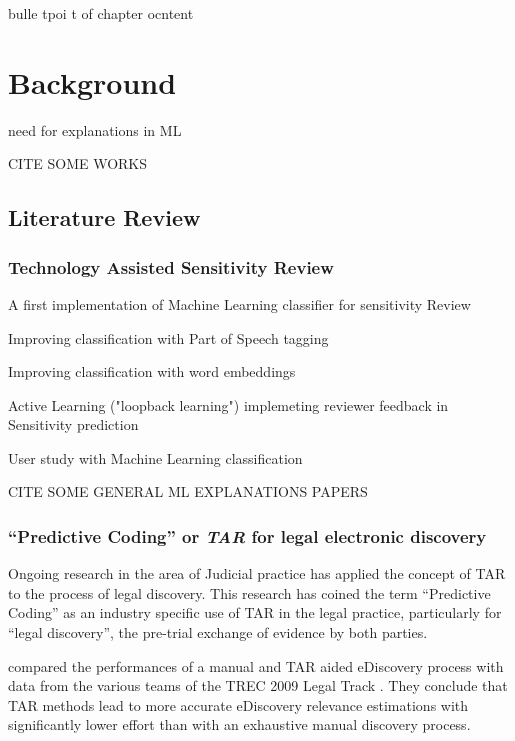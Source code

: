 \documentclass{l4proj}
\begin{document}
bulle tpoi t of chapter ocntent


\chapter{Background}

need for explanations in ML

CITE SOME WORKS

\section{Literature Review}

\subsection{Technology Assisted Sensitivity Review}


\autocite{de_rijke_towards_2014} A first implementation of Machine Learning classifier for sensitivity Review

\autocite{mcdonaldUsingPartofSpeechNgrams2015} Improving classification with Part of Speech tagging

\autocite{jose_enhancing_2017} Improving classification with word embeddings

\autocite{pasi_active_2018} Active Learning ("loopback learning") implemeting reviewer feedback in Sensitivity prediction

\autocite{mcdonaldHowSensitivityClassification2019} User study with Machine Learning classification

CITE SOME GENERAL ML EXPLANATIONS PAPERS

\subsection{``Predictive Coding'' or \textit{TAR} for legal electronic discovery}

Ongoing research in the area of Judicial practice has applied the concept of TAR to the process of legal discovery. 
This research has coined the term ``Predictive Coding'' \autocite{carrollGrossmancormackGlossaryTechnologyassisted2013} as an industry specific use of TAR in the legal practice, particularly for ``legal discovery'', the pre-trial exchange of evidence by both parties. 

\textcite{grossmanTechnologyAssistedReviewEDiscovery2010} compared the performances of a manual and TAR aided eDiscovery process with data from the various teams of the TREC 2009 Legal Track \autocite{hedinOverviewTREC2009}. They conclude that TAR methods lead to more accurate eDiscovery relevance estimations with significantly lower effort than with an exhaustive manual discovery process.
\end{document}

